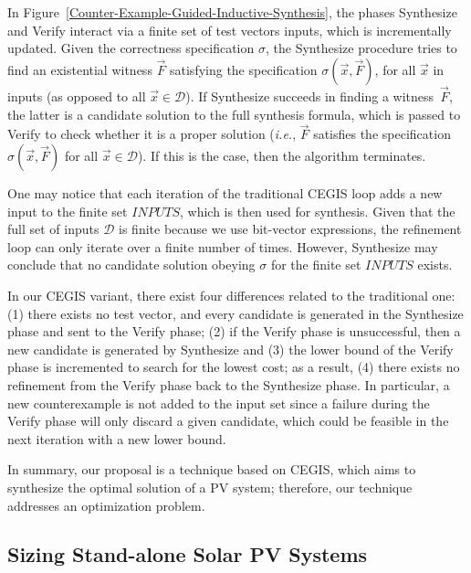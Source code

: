 \documentclass[journal]{IEEEtran}
\begin{document}
In Figure~\ref{Counter-Example-Guided-Inductive-Synthesis}, the phases {\sc Synthesize} and {\sc Verify} interact via a finite set of test vectors {\sc inputs}, which is incrementally updated. Given the correctness specification $\sigma$, the {\sc Synthesize} procedure tries to find an existential witness $\vec{F}$ satisfying the specification $\sigma(\vec{x}, \vec{F})$, for all $\vec{x}$ in {\sc inputs} (as opposed to all $\vec{x} \in \mathcal{D}$). If {\sc Synthesize} succeeds in finding a witness~$\vec{F}$, the latter is a candidate solution to the full synthesis formula, which is passed to {\sc Verify} to check whether it is a proper solution ({\it i.e.}, $\vec{F}$ satisfies the specification $\sigma(\vec{x}, \vec{F})$ for all $\vec{x}\in\mathcal{D}$). If this is the case, then the algorithm terminates.

One may notice that each iteration of the traditional CEGIS loop adds a new input to the finite set $INPUTS$, which is then used for synthesis. Given that the full set of inputs $\mathcal{D}$ is finite because we use bit-vector expressions, the refinement loop can only iterate over a finite number of times. However, {\sc Synthesize} may conclude that no candidate solution obeying $\sigma$ for the finite set $INPUTS$ exists. 

In our CEGIS variant, there exist four differences related to the traditional one: 
(1) there exists no test vector, and every candidate is generated in the {\sc Synthesize} phase and sent to the {\sc Verify} phase; 
(2) if the {\sc Verify} phase is unsuccessful, then a new candidate is generated by {\sc Synthesize} and 
(3) the lower bound of the {\sc Verify} phase is incremented to search for the lowest cost; as a result,
(4) there exists no refinement from the {\sc Verify} phase back to the {\sc Synthesize} phase. In particular, a new counterexample is not added to the {\sc input} set since a failure during the {\sc Verify} phase will only discard a given candidate, which could be feasible in the next iteration with a new lower bound.

In summary, our proposal is a technique based on CEGIS, which aims to synthesize the optimal solution of a PV system; therefore, our technique addresses an optimization problem.

\subsection{Sizing Stand-alone Solar PV Systems}
\label{sec:sizing}
\end{document}
